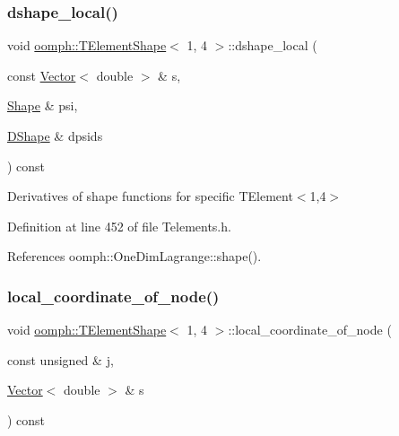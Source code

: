 \mbox{\label{classoomph_1_1TElementShape_3_011_00_014_01_4_afd00ae8e2a82badd8d43196481da8ce7}} 
\subsubsection{\texorpdfstring{dshape\+\_\+local()}{dshape\_local()}}
{\footnotesize\ttfamily void \hyperlink{classoomph_1_1TElementShape}{oomph\+::\+T\+Element\+Shape}$<$ 1, 4 $>$\+::dshape\+\_\+local (\begin{DoxyParamCaption}\item[{const \hyperlink{classoomph_1_1Vector}{Vector}$<$ double $>$ \&}]{s,  }\item[{\hyperlink{classoomph_1_1Shape}{Shape} \&}]{psi,  }\item[{\hyperlink{classoomph_1_1DShape}{D\+Shape} \&}]{dpsids }\end{DoxyParamCaption}) const\hspace{0.3cm}{\ttfamily [inline]}}



Derivatives of shape functions for specific T\+Element$<$1,4$>$ 



Definition at line 452 of file Telements.\+h.



References oomph\+::\+One\+Dim\+Lagrange\+::shape().

\mbox{\label{classoomph_1_1TElementShape_3_011_00_014_01_4_a3509c3a0ef9eaab7fa760fb6cdf85f0d}} 
\subsubsection{\texorpdfstring{local\+\_\+coordinate\+\_\+of\+\_\+node()}{local\_coordinate\_of\_node()}}
{\footnotesize\ttfamily void \hyperlink{classoomph_1_1TElementShape}{oomph\+::\+T\+Element\+Shape}$<$ 1, 4 $>$\+::local\+\_\+coordinate\+\_\+of\+\_\+node (\begin{DoxyParamCaption}\item[{const unsigned \&}]{j,  }\item[{\hyperlink{classoomph_1_1Vector}{Vector}$<$ double $>$ \&}]{s }\end{DoxyParamCaption}) const\hspace{0.3cm}{\ttfamily [inline]}}



